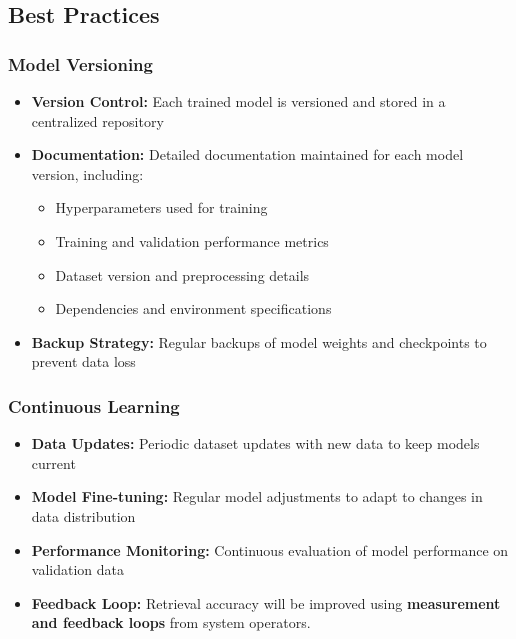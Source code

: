 \subsection{Best Practices}
\label{subsection:best-practices}

\subsubsection{Model Versioning}
\label{subsubsection:model-versioning}

\begin{itemize}
    \item \textbf{Version Control:} Each trained model is versioned and stored in a centralized repository
    \item \textbf{Documentation:} Detailed documentation maintained for each model version, including:
    \begin{itemize}
        \item Hyperparameters used for training
        \item Training and validation performance metrics
        \item Dataset version and preprocessing details
        \item Dependencies and environment specifications
    \end{itemize}
    \item \textbf{Backup Strategy:} Regular backups of model weights and checkpoints to prevent data loss
\end{itemize}

\subsubsection{Continuous Learning}
\label{subsubsection:continuous-learning}

\begin{itemize}
    \item \textbf{Data Updates:} Periodic dataset updates with new data to keep models current
    \item \textbf{Model Fine-tuning:} Regular model adjustments to adapt to changes in data distribution
    \item \textbf{Performance Monitoring:} Continuous evaluation of model performance on validation data
    \item \textbf{Feedback Loop:} Retrieval accuracy will be improved using \textbf{measurement and feedback loops} from system operators.
\end{itemize}

